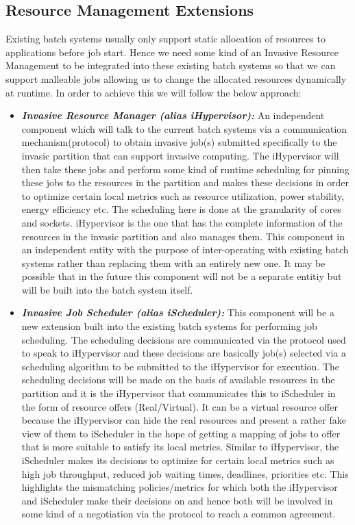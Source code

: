 \subsection{Resource Management Extensions}
Existing batch systems usually only support static allocation of resources to applications before job start. Hence we need some kind of an Invasive Resource Management to be integrated into these existing batch systems so that we can support malleable jobs allowing us to change the allocated resources dynamically at runtime. In order to achieve this we will follow the below approach:
\begin{itemize}
\item \textbf{\textit{Invasive Resource Manager (alias iHypervisor):}} An independent component which will talk to the current batch systems via a communication mechanism(protocol) to obtain invasive job(s) submitted specifically to the invasic partition that can support invasive computing. The iHypervisor will then take these jobs and perform some kind of runtime scheduling for pinning these jobs to the resources in the partition and makes these decisions in order to optimize certain local metrics such as resource utilization, power stability, energy efficiency etc. The scheduling here is done at the granularity of cores and sockets. iHypervisor is the one that has the complete information of the resources in the invasic partition and also manages them. This component in an independent entity with the purpose of inter-operating with existing batch systems rather than replacing them with an entirely new one. It may be possible that in the future this component will not be a separate entitiy but will be built into the batch system itself.
\item \textbf{\textit{Invasive Job Scheduler (alias iScheduler):}} This component will be a new extension built into the existing batch systems for performing job scheduling. The scheduling decisions are communicated via the protocol used to speak to iHypervisor and these decisions are basically job(s) selected via a scheduling algorithm to be submitted to the iHypervisor for execution. The scheduling decisions will be made on the basis of available resources in the partition and it is the iHypervisor that communicates this to iScheduler in the form of resource offers (Real/Virtual). It can be a virtual resource offer because the iHypervisor can hide the real resources and present a rather fake view of them to iScheduler in the hope of getting a mapping of jobs to offer that is more suitable to satisfy its local metrics. Similar to iHypervisor, the iScheduler makes its decisions to optimize for certain local metrics such as high job throughput, reduced job waiting times, deadlines, priorities etc. This highlights the mismatching policies/metrics for which both the iHypervisor and iScheduler make their decisions on and hence both will be involved in some kind of a negotiation via the protocol to reach a common agreement.

\end{itemize}
